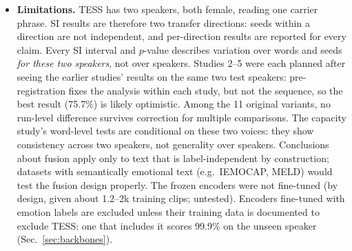 \begin{itemize}
\item \textbf{Limitations.} TESS has two speakers, both female, reading one carrier phrase. SI results are therefore two transfer directions: seeds within a direction are not independent, and per-direction results are reported for every claim. Every SI interval and $p$-value describes variation over words and seeds \emph{for these two speakers}, not over speakers. Studies 2--5 were each planned after seeing the earlier studies' results on the same two test speakers: pre-registration fixes the analysis within each study, but not the sequence, so the best result (75.7\%) is likely optimistic. Among the 11 original variants, no run-level difference survives correction for multiple comparisons. The capacity study's word-level tests are conditional on these two voices: they show consistency across two speakers, not generality over speakers. Conclusions about fusion apply only to text that is label-independent by construction; datasets with semantically emotional text (e.g.\ IEMOCAP, MELD) would test the fusion design properly. The frozen encoders were not fine-tuned (by design, given about 1.2--2k training clips; untested). Encoders fine-tuned with emotion labels are excluded unless their training data is documented to exclude TESS: one that includes it scores 99.9\% on the unseen speaker (Sec.~\ref{sec:backbones}).

\end{itemize}

